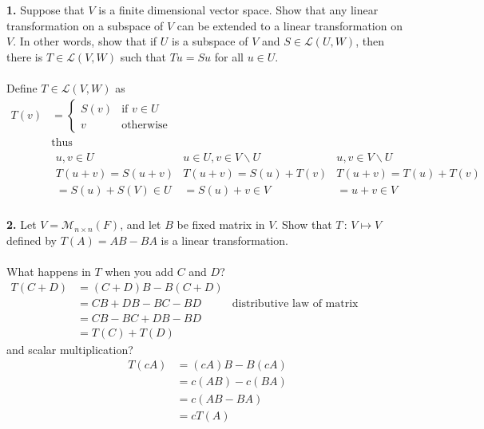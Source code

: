 \documentclass[11pt]{amsart}
\theoremstyle{definition}  %
\begin{document}

\noindent
{\bf 1.} Suppose that $V$ is a finite dimensional vector space. Show that any linear transformation on a subspace of $V$ can be extended to a 
linear transformation on $V$. In other words, show that if $U$ is a subspace of $V$ and $S \in \mathcal{L}(U,W)$, then there is 
$T \in \mathcal{L}(V,W)$ such that $Tu = Su$ for all $u \in U$. \\
\\
Define $T\in \mathcal{L}(V,W)$ as 
\begin{align*}
	T(v) &= \left \{ \begin{array}{ll}
		S(v) & \text{if } v \in U\\
		v & \text{otherwise }	
	\end{array} \right .\\
	&\text{thus}\\
	&\begin{array}{c|c|c}
		u,v \in U & u \in U, v \in V\backslash U& u,v \in V \backslash U \\\hline
		T(u+v)=S(u+v) &T(u+v)=S(u)+T(v) &T(u+v)=T(u)+T(v)\\
		=S(u)+S(V) \in U & = S(u)+v \in V &=u+v \in V 
	\end{array}
\end{align*}  
\\

\vskip 0.1cm
\noindent
{\bf 2.} Let $V = \mathcal{M}_{n \times n}(F)$, and let $B$ be fixed matrix in $V$. Show that $T \, : \, V \mapsto V$ defined by
$T(A) = AB-BA$ is a linear transformation. \\
\\
What happens in $T$ when you add $C$ and $D$?\
\begin{align*}
	T(C+D) &= (C+D)B-B(C+D) \\
	&= CB+DB -BC-BD & \text{distributive law of matrix multiplication}\\
	&= CB-BC+DB-BD \\
	&= T(C)+ T(D)
\end{align*}and scalar multiplication?
\begin{align*}
	T(cA) &= (cA)B-B(cA) \\
	&= c(AB)-c(BA) \\
	&= c(AB-BA) \\
	&= cT(A)
\end{align*}
\\
\end{document}
